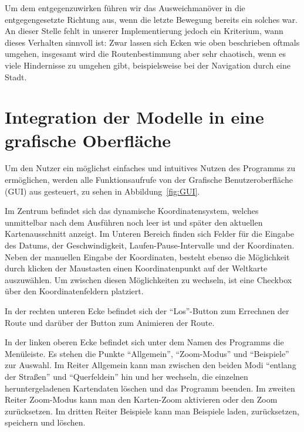 \documentclass[
    paper=a4,
    DIV14,
    fontsize=12pt,
    pagesize=pdftex,
    toc=bibliographynumbered
]{scrartcl}
\numberwithin{figure}{section}
\numberwithin{equation}{section}
\numberwithin{table}{section}
\begin{document}
Um dem entgegenzuwirken führen wir das Ausweichmanöver in die entgegengesetzte Richtung
aus, wenn die letzte Bewegung bereits ein solches war. An dieser Stelle fehlt in unserer
Implementierung jedoch ein Kriterium, wann dieses Verhalten sinnvoll ist: Zwar lassen sich
Ecken wie oben beschrieben oftmals umgehen, insgesamt wird die Routenbestimmung aber sehr
chaotisch, wenn es viele Hindernisse zu umgehen gibt, beispielsweise bei der Navigation
durch eine Stadt.

\section{Integration der Modelle in eine grafische Oberfläche}
\label{sec:gui}

Um den Nutzer ein möglichst einfaches und intuitives Nutzen des Programms zu ermöglichen,
werden alle Funktionsaufrufe von der Grafische Benutzeroberfläche (GUI) aus gesteuert,
zu sehen in Abbildung~\ref{fig:GUI}.

Im Zentrum befindet sich das dynamische Koordinatensystem, welches unmittelbar nach dem
Ausführen noch leer ist und später den aktuellen Kartenausschnitt anzeigt. Im Unteren
Bereich finden sich Felder für die Eingabe des Datums, der Geschwindigkeit,
Laufen-Pause-Intervalle und der Koordinaten. Neben der manuellen Eingabe der Koordinaten,
besteht ebenso die Möglichkeit durch klicken der Maustasten einen Koordinatenpunkt auf der
Weltkarte auszuwählen. Um zwischen diesen Möglichkeiten zu wechseln, ist eine Checkbox
über den Koordinatenfeldern platziert.

In der rechten unteren Ecke befindet sich der \enquote{Los}-Button zum Errechnen der Route
und darüber der Button zum Animieren der Route.

In der linken oberen Ecke befindet sich unter dem Namen des Programms die Menüleiste. Es
stehen die Punkte \enquote{Allgemein}, \enquote{Zoom-Modus} und \enquote{Beispiele} zur
Auswahl. Im Reiter Allgemein kann man zwischen den beiden Modi \enquote{entlang der
Straßen} und \enquote{Querfeldein} hin und her wechseln, die einzelnen heruntergeladenen
Kartendaten löschen und das Programm beenden. Im zweiten Reiter Zoom-Modus kann man den
Karten-Zoom aktivieren oder den Zoom zurücksetzen. Im dritten Reiter Beispiele kann man
Beispiele laden, zurücksetzen, speichern und löschen.
\end{document}
